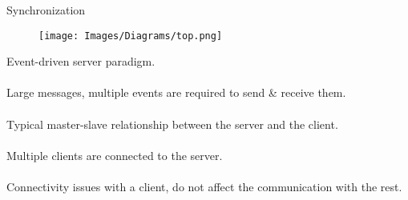     


\begin{frame}{Synchronization}
	\begin{minipage}{0.4\textwidth}
        \begin{figure}[H]
            \centering
                \texttt{[image: Images/Diagrams/top.png]}
        \end{figure}
    \end{minipage}%
	\begin{minipage}{0.6\textwidth}
	    Event-driven server paradigm.\\\\
	    Large messages, multiple events are required to send \& receive them.\\\\
        Typical master-slave relationship between the server and the client.\\\\
        Multiple clients are connected to the server.\\\\
        Connectivity issues with a client, do not affect the communication with the rest.
    \end{minipage}
\end{frame}


